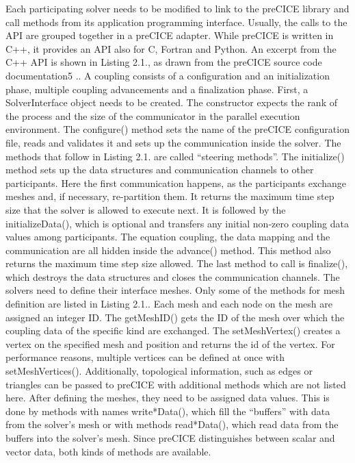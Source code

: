 Each participating solver needs to be modified to link to the preCICE library and call
methods from its application programming interface. Usually, the calls to the API are
grouped together in a preCICE adapter. While preCICE is written in C++, it provides an
API also for C, Fortran and Python. An excerpt from the C++ API is shown in Listing 2.1.,
as drawn from the preCICE source code documentation5
..
A coupling consists of a configuration and an initialization phase, multiple coupling advancements
and a finalization phase. First, a SolverInterface object needs to be created.
The constructor expects the rank of the process and the size of the communicator in the
parallel execution environment. The configure() method sets the name of the preCICE
configuration file, reads and validates it and sets up the communication inside the solver.
The methods that follow in Listing 2.1. are called “steering methods”. The initialize()
method sets up the data structures and communication channels to other participants. Here
the first communication happens, as the participants exchange meshes and, if necessary,
re-partition them. It returns the maximum time step size that the solver is allowed to
execute next. It is followed by the initializeData(), which is optional and transfers any
initial non-zero coupling data values among participants. The equation coupling, the data
mapping and the communication are all hidden inside the advance() method. This method
also returns the maximum time step size allowed. The last method to call is finalize(),
which destroys the data structures and closes the communication channels.
The solvers need to define their interface meshes. Only some of the methods for mesh
definition are listed in Listing 2.1.. Each mesh and each node on the mesh are assigned an
integer ID. The getMeshID() gets the ID of the mesh over which the coupling data of the
specific kind are exchanged. The setMeshVertex() creates a vertex on the specified mesh
and position and returns the id of the vertex. For performance reasons, multiple vertices
can be defined at once with setMeshVertices(). Additionally, topological information,
such as edges or triangles can be passed to preCICE with additional methods which are not
listed here.
After defining the meshes, they need to be assigned data values. This is done by methods
with names write*Data(), which fill the “buffers” with data from the solver’s mesh or
with methods read*Data(), which read data from the buffers into the solver’s mesh. Since
preCICE distinguishes between scalar and vector data, both kinds of methods are available.
